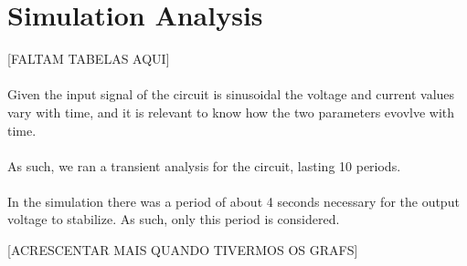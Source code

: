 \section{Simulation Analysis}
\label{sec:simulation}

[FALTAM TABELAS AQUI]

\paragraph{} Given the input signal of the circuit is sinusoidal the voltage and current values vary with time, and it is relevant to know how the two parameters evovlve with time.

\paragraph{} As such, we ran a transient analysis for the circuit, lasting 10 periods.

\paragraph{} In the simulation there was a period of about 4 seconds necessary for the output voltage to stabilize. As such, only this period is considered.

[ACRESCENTAR MAIS QUANDO TIVERMOS OS GRAFS]